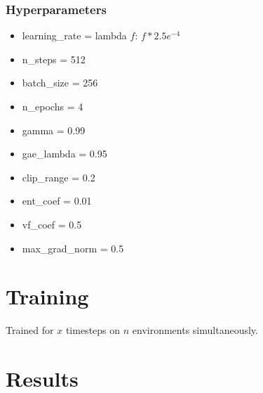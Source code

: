 \documentclass{article}
\begin{document}
    \subsubsection{Hyperparameters}
    \begin{itemize}
        \item learning\_rate = lambda $f$: $f * 2.5e^{-4}$
        \item n\_steps = 512
        \item batch\_size = 256
        \item n\_epochs = 4
        \item gamma = 0.99
        \item gae\_lambda = 0.95
        \item clip\_range = 0.2
        \item ent\_coef = 0.01
        \item vf\_coef = 0.5
        \item max\_grad\_norm = 0.5
    \end{itemize}
    \section{Training}
    Trained for $x$ timesteps on $n$ environments simultaneously.

    \section{Results}
\end{document}
